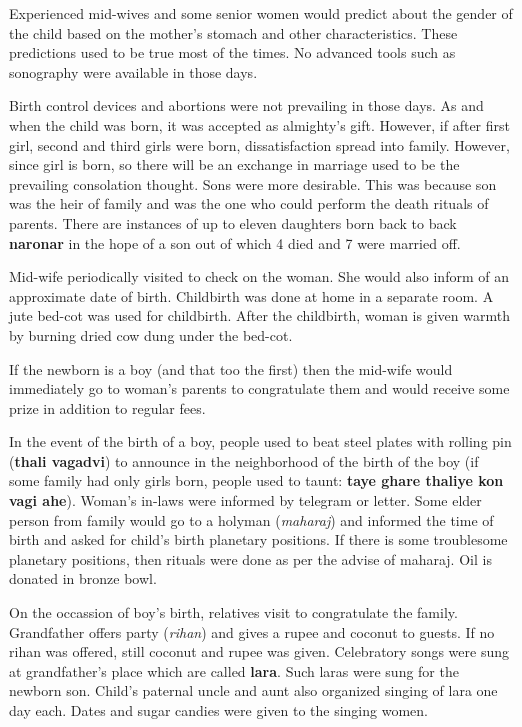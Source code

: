 Experienced mid-wives and some senior women would predict about the gender of the
child based on the mother's stomach and other characteristics. These
predictions used to be true most of the times. No advanced tools such as
sonography were available in those days.

Birth control devices and abortions were not prevailing in those days. As and
when the child was born, it was accepted as almighty's gift. However, if after
first girl, second and third girls were born, dissatisfaction spread
into family. However, since girl is born, so there will be an exchange in
marriage used to be the prevailing consolation thought. Sons were more desirable. This was
because son was the heir of family and was the one who could perform the death
rituals of parents. There are instances of up to eleven daughters born back to
back \textbf{naronar} in the hope of a son out of which 4 died and 7 were
married off.

Mid-wife periodically visited to check on the woman. She would also inform of an
approximate date of birth. Childbirth was done at home in a separate room. A
jute bed-cot was used for childbirth. After the childbirth, woman is given
warmth by burning dried cow dung under the bed-cot.

If the newborn is a boy (and that too the first) then the mid-wife would
immediately go to woman's parents to congratulate them and would receive some
prize in addition to regular fees.

In the event of the birth of a boy, people used to beat steel plates with
rolling pin (\textbf{thali vagadvi}) to announce in the neighborhood of the
birth of the boy (if some family had only girls born, people used to taunt:
\textbf{taye ghare thaliye kon vagi ahe}). Woman's in-laws were informed by
telegram or letter. Some elder person from family would go to a holyman
(\textit{maharaj}) and informed the time of birth and asked for child's birth
planetary positions. If there is some troublesome planetary positions, then
rituals were done as per the advise of maharaj. Oil is donated in bronze bowl.

On the occassion of boy's birth, relatives visit to congratulate the
family. Grandfather offers party (\textit{rihan}) and gives a rupee and coconut
to guests. If no rihan was offered, still coconut and rupee was given.
Celebratory songs were sung at grandfather's place which are called
\textbf{lara}. Such laras were sung for the newborn son. Child's paternal uncle
and aunt also organized singing of lara one day each. Dates and sugar candies
were given to the singing women.

